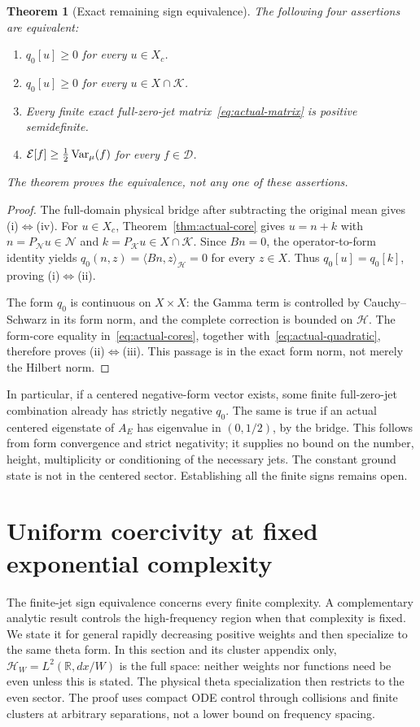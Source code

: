 \documentclass[11pt,a4paper]{article}
\numberwithin{equation}{section}
\newtheorem{theorem}{Theorem}[section]
\theoremstyle{definition}\newtheorem{definition}[theorem]{Definition}
\theoremstyle{remark}\newtheorem{remark}[theorem]{Remark}
\newcommand{\R}{\mathbb R}\newcommand{\C}{\mathbb C}\newcommand{\N}{\mathbb N}
\newcommand{\E}{\mathcal E}\newcommand{\D}{\mathcal D}
\newcommand{\Hh}{\mathcal H}\newcommand{\Hw}{\mathcal H}
\newcommand{\HH}{\mathcal H_W}\newcommand{\XX}{X_W}\newcommand{\EE}{\mathcal E_{N,\beta}}
\newcommand{\ip}[2]{\langle#1,#2\rangle}\newcommand{\norm}[1]{\lVert#1\rVert}\newcommand{\abs}[1]{\lvert#1\rvert}
\newcommand{\Nn}{\mathcal N}\newcommand{\Ii}{\mathcal I}\newcommand{\Zz}{\mathcal Z}
\newcommand{\Kk}{\mathcal K}\newcommand{\Aa}{\mathcal A}\newcommand{\Ff}{\mathcal F}
\begin{document}
\begin{theorem}[Exact remaining sign equivalence]\label{thm:actual-sign}
The following four assertions are equivalent:
\begin{enumerate}[label=\textup{(\roman*)}]
\item $q_0[u]\ge0$ for every $u\in X_c$.
\item $q_0[u]\ge0$ for every $u\in X\cap\Kk$.
\item Every finite exact full-zero-jet matrix~\eqref{eq:actual-matrix} is positive semidefinite.
\item $\E[f]\ge\tfrac12\Var_\mu(f)$ for every $f\in\D$.
\end{enumerate}
The theorem proves the equivalence, not any one of these assertions.
\end{theorem}
\begin{proof}
The full-domain physical bridge after subtracting the original mean gives (i)$\Leftrightarrow$(iv). For $u\in X_c$, Theorem~\ref{thm:actual-core} gives $u=n+k$ with $n=P_{\Nn}u\in\Nn$ and $k=P_{\Kk}u\in X\cap\Kk$. Since $Bn=0$, the operator-to-form identity yields $q_0(n,z)=\ip{Bn}{z}_{\Hh}=0$ for every $z\in X$. Thus $q_0[u]=q_0[k]$, proving (i)$\Leftrightarrow$(ii).

The form $q_0$ is continuous on $X\times X$: the Gamma term is controlled by Cauchy--Schwarz in its form norm, and the complete correction is bounded on $\Hh$. The form-core equality in~\eqref{eq:actual-cores}, together with~\eqref{eq:actual-quadratic}, therefore proves (ii)$\Leftrightarrow$(iii). This passage is in the exact form norm, not merely the Hilbert norm.
\end{proof}

In particular, if a centered negative-form vector exists, some finite full-zero-jet combination already has strictly negative $q_0$. The same is true if an actual centered eigenstate of $A_E$ has eigenvalue in $(0,1/2)$, by the bridge. This follows from form convergence and strict negativity; it supplies no bound on the number, height, multiplicity or conditioning of the necessary jets. The constant ground state is not in the centered sector. Establishing all the finite signs remains open.


\section{Uniform coercivity at fixed exponential complexity}\label{sec:complexity-unified}
The finite-jet sign equivalence concerns every finite complexity. A complementary analytic result controls the high-frequency region when that complexity is fixed. We state it for general rapidly decreasing positive weights and then specialize to the same theta form. In this section and its cluster appendix only, $\HH=L^2(\R,dx/W)$ is the full space: neither weights nor functions need be even unless this is stated. The physical theta specialization then restricts to the even sector. The proof uses compact ODE control through collisions and finite clusters at arbitrary separations, not a lower bound on frequency spacing.
\end{document}
